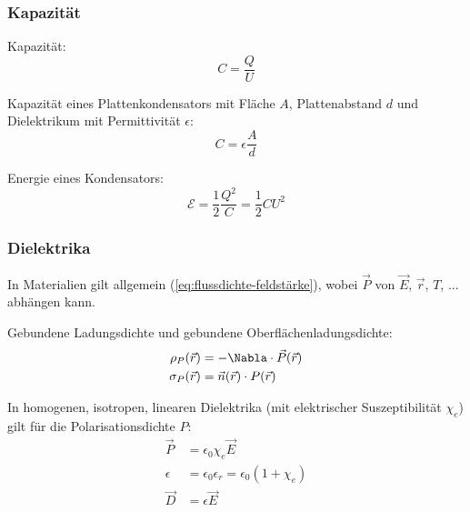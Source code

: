 \documentclass[11pt]{article}
\numberwithin{equation}{section}
\begin{document}
      \subsubsection{Kapazität}
        Kapazität:
        \begin{equation}
          C=\frac{Q}{U}
        \end{equation}

        Kapazität eines Plattenkondensators mit Fläche $A$, Plattenabstand $d$ und Dielektrikum mit Permittivität $\epsilon$:
        \begin{equation}
          C=\epsilon \frac{A}{d}
        \end{equation}

        Energie eines Kondensators:
        \begin{equation}
          \mathcal{E} = \frac{1}{2}\frac{Q^2}{C} = \frac{1}{2}CU^2
        \end{equation}

      \subsubsection{Dielektrika}
        In Materialien gilt allgemein (\ref{eq:flussdichte-feldstärke}), wobei $\vec{P}$ von $\vec{E}$, $\vec{r}$, $T$, ... abhängen kann. \vspace{10pt}

        Gebundene Ladungsdichte und gebundene Oberflächenladungsdichte:
        \begin{equation}
          \begin{aligned}
            \rho_P(\vec{r}) &= -\Nabla \cdot\vec{P}(\vec{r}) \\
            \sigma_P(\vec{r}) &= \vec{n}(\vec{r})\cdot P(\vec{r})
          \end{aligned}
        \end{equation}

        In homogenen, isotropen, linearen Dielektrika (mit elektrischer Suszeptibilität $\chi_e$) gilt für die Polarisationsdichte $P$:
        \begin{equation}
          \begin{aligned}
            \vec{P} &= \epsilon_0 \chi_e \vec{E} \\
            \epsilon &= \epsilon_0 \epsilon_r = \epsilon_0(1+\chi_e) \\
            \vec{D} &= \epsilon \vec{E} \\
          \end{aligned}
        \end{equation}
\end{document}
